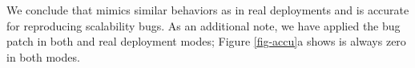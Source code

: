 


We conclude that \sck mimics similar behaviors as in real deployments and
is accurate for reproducing scalability bugs.
%
As an additional note, we have applied the bug patch in both \sck and real
deployment modes;  Figure \ref{fig-accu}a shows \flaps is always zero in
both modes.




